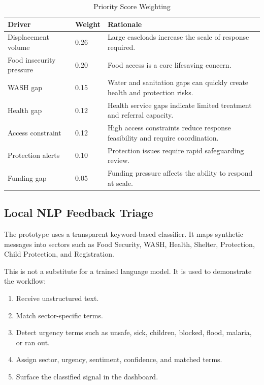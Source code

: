 \documentclass[11pt,a4paper]{article}
\begin{document}
\begin{table}[H]
\centering
\caption{Priority Score Weighting}
\begin{tabularx}{\textwidth}{p{}p{}Y}
\toprule
\textbf{Driver} & \textbf{Weight} & \textbf{Rationale} \\
\midrule
Displacement volume & 0.26 & Large caseloads increase the scale of response required. \\
Food insecurity pressure & 0.20 & Food access is a core lifesaving concern. \\
WASH gap & 0.15 & Water and sanitation gaps can quickly create health and protection risks. \\
Health gap & 0.12 & Health service gaps indicate limited treatment and referral capacity. \\
Access constraint & 0.12 & High access constraints reduce response feasibility and require coordination. \\
Protection alerts & 0.10 & Protection issues require rapid safeguarding review. \\
Funding gap & 0.05 & Funding pressure affects the ability to respond at scale. \\
\bottomrule
\end{tabularx}
\end{table}

\subsection{Local NLP Feedback Triage}

The prototype uses a transparent keyword-based classifier. It maps synthetic messages into sectors such as Food Security, WASH, Health, Shelter, Protection, Child Protection, and Registration.

This is not a substitute for a trained language model. It is used to demonstrate the workflow:

\begin{enumerate}
  \item Receive unstructured text.
  \item Match sector-specific terms.
  \item Detect urgency terms such as unsafe, sick, children, blocked, flood, malaria, or ran out.
  \item Assign sector, urgency, sentiment, confidence, and matched terms.
  \item Surface the classified signal in the dashboard.
\end{enumerate}
\end{document}
